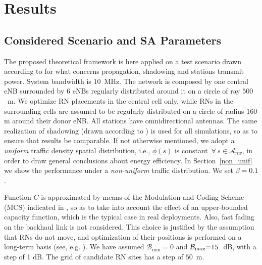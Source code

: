 \documentclass[draftcls,onecolumn]{IEEEtran}
\theoremstyle{plain}
\theoremstyle{definition}
\begin{document}
%
 
\section{Results}\label{results}



\subsection{Considered Scenario and SA Parameters}
The proposed theoretical framework is here applied on a test scenario drawn according to \cite[case 1]{3gpprelayperf} for what concerns propagation, shadowing and stations transmit power. System bandwidth is $10$~MHz. The network is composed by one central eNB surrounded by 6 eNBs regularly distributed around it on a circle of ray $500$~m. We optimize RN placements in the central cell only, while RNs in the surrounding cells are assumed to be regularly distributed on a circle of radius 160 m around their donor eNB. All stations have omnidirectional antennas. The same realization of shadowing (drawn according to \cite{3gpprelayperf}) is used for all simulations, so as to ensure that results be comparable. If not otherwise mentioned, we adopt a {\it uniform} traffic density spatial distribution, i.e., $\phi(s)$ is constant $\, \forall \, s {\in} \mathcal{A}_{nw}$, in order to draw general conclusions about energy efficiency. In Section~\ref{non_unif} we show the performance under a {\it non-uniform} traffic distribution. We set $\beta{=}0.1$. 

Function $C$ is approximated by means of the Modulation and Coding Scheme (MCS) indicated in \cite{36.942}, so as to take into account the effect of an upper-bounded capacity function, which is the typical case in real deployments. Also, fast fading on the backhaul link is not considered. This choice is justified by the assumption that RNs do not move, and optimization of their positions is performed on a long-term basis (see, e.g. \cite{salehFF}). 
We have assumed $\mathcal{B}_{\min}{=}0$ and $\mathcal{B}_{\max}{=}15 \hspace{2 pt}$~dB, with a step of 1 dB. The grid of candidate RN sites has a step of $50$~m.
    
\end{document}
